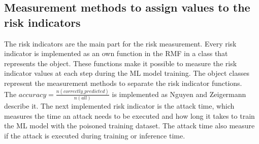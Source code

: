 \subsection{Measurement methods to assign values to the risk indicators}

The risk indicators are the main part for the risk measurement. Every risk indicator is implemented as an own function in the RMF in a class that represents the object. These functions make it possible to measure the risk indicator values at each step during the ML model training. The object classes represent the measurement methods to separate the risk indicator functions. \\
The $accuracy=\frac{n(correctly\_predicted)}{n(all)}$ is implemented as Nguyen and Zeigermann \cite{9783960101925} describe it. The next implemented risk indicator is the attack time, which measures the time an attack needs to be executed and how long it takes to train the ML model with the poisoned training dataset. The attack time also measure if the attack is executed during training or inference time. \\
